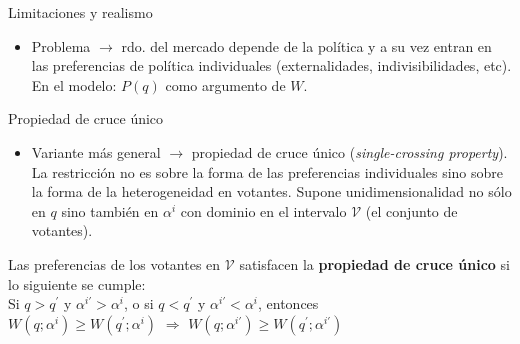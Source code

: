 \documentclass[
  ignorenonframetext,
]{beamer}
\providecommand{\tightlist}{%
  \setlength{\itemsep}{0pt}\setlength{\parskip}{0pt}}\usepackage{longtable,booktabs,array}
\begin{document}
\begin{frame}
\begin{block}{Limitaciones y realismo}
\begin{itemize}
  \begin{itemize}
  \tightlist
  \item
    Problema \(\longrightarrow\) rdo. del mercado depende de la política
    y a su vez entran en las preferencias de política individuales
    (externalidades, indivisibilidades, etc). En el modelo: \(P(q)\)
    como argumento de \(W\).
  \end{itemize}
\end{itemize}
\end{block}

\begin{block}{Propiedad de cruce único}
\protect\hypertarget{propiedad-de-cruce-uxfanico}{}
\begin{itemize}
\tightlist
\item
  Variante más general \(\longrightarrow\) propiedad de cruce único
  (\emph{single-crossing property}). La restricción no es sobre la forma
  de las preferencias individuales sino sobre la forma de la
  heterogeneidad en votantes. Supone unidimensionalidad no sólo en \(q\)
  sino también en \(\alpha^{i}\) con dominio en el intervalo
  \(\mathcal{V}\) (el conjunto de votantes).
\end{itemize}

\begin{tcolorbox}[enhanced jigsaw, titlerule=0mm, breakable, colback=white, left=2mm, coltitle=black, toptitle=1mm, leftrule=.75mm, opacityback=0, bottomtitle=1mm, opacitybacktitle=0.6, colbacktitle=quarto-callout-note-color!10!white, title={Definición 3}, toprule=.15mm, colframe=quarto-callout-note-color-frame, rightrule=.15mm, arc=.35mm, bottomrule=.15mm]

Las preferencias de los votantes en \(\mathcal{V}\) satisfacen la
\textbf{propiedad de cruce único} si lo siguiente se cumple:\\
Si \(q>q^{'}\) y \(\alpha^{i'}>\alpha^{i}\), o si \(q<q^{'}\) y
\(\alpha^{i'}<\alpha^{i}\), entonces\\
\(W(q;\alpha^{i}) \geq W(q^{'};\alpha^{i})\) \(\Rightarrow\)
\(W(q;\alpha^{i'}) \geq W(q^{'};\alpha^{i'})\)

\end{tcolorbox}
\end{block}
\end{frame}
\end{document}

